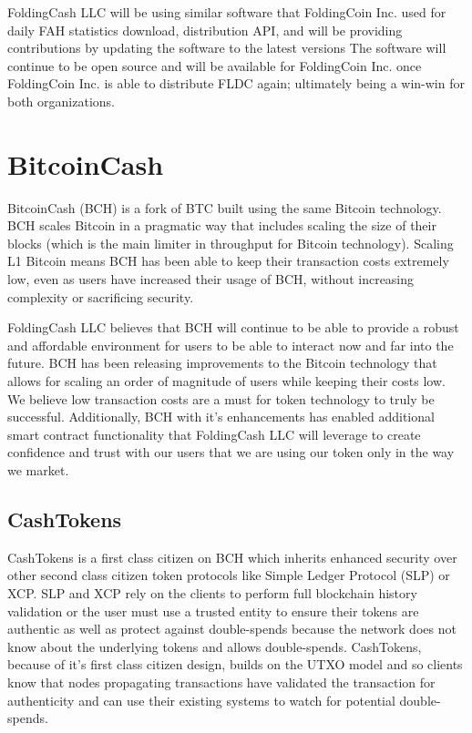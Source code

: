 \documentclass[letterpaper,12pt,titlepage]{article}
\def\org{FoldingCash LLC}
\begin{document}
\org{} will be using similar software that FoldingCoin Inc. used for daily FAH statistics download, distribution API, and will be providing contributions by updating the software to the latest versions  The software will continue to be open source and will be available for FoldingCoin Inc. once FoldingCoin Inc. is able to distribute FLDC again; ultimately being a win-win for both organizations.

\section{BitcoinCash}
BitcoinCash (BCH) is a fork of BTC built using the same Bitcoin technology. BCH scales Bitcoin in a pragmatic way that includes scaling the size of their blocks (which is the main limiter in throughput for Bitcoin technology). Scaling L1 Bitcoin means BCH has been able to keep their transaction costs extremely low, even as users have increased their usage of BCH, without increasing complexity or sacrificing security.

\org{} believes that BCH will continue to be able to provide a robust and affordable environment for users to be able to interact now and far into the future. BCH has been releasing improvements to the Bitcoin technology that allows for scaling an order of magnitude of users while keeping their costs low. We believe low transaction costs are a must for token technology to truly be successful. Additionally, BCH with it's enhancements has enabled additional smart contract functionality that \org{} will leverage to create confidence and trust with our users that we are using our token only in the way we market.

\subsection{CashTokens}
CashTokens is a first class citizen on BCH which inherits enhanced security over other second class citizen token protocols like Simple Ledger Protocol (SLP) or XCP. SLP and XCP rely on the clients to perform full blockchain history validation or the user must use a trusted entity to ensure their tokens are authentic as well as protect against double-spends because the network does not know about the underlying tokens and allows double-spends. CashTokens, because of it's first class citizen design, builds on the UTXO model and so clients know that nodes propagating transactions have validated the transaction for authenticity and can use their existing systems to watch for potential double-spends.
\end{document}
